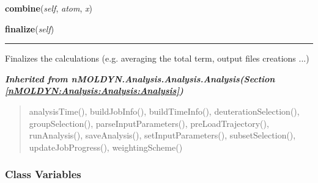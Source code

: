     \vspace{0.5ex}

\hspace{.8\funcindent}\begin{boxedminipage}{\funcwidth}

    \raggedright \textbf{combine}(\textit{self}, \textit{atom}, \textit{x})

\setlength{\parskip}{2ex}
\setlength{\parskip}{1ex}
    \end{boxedminipage}

    \label{nMOLDYN:Analysis:Dynamics:PassBandFilteredTrajectory:finalize}

    \vspace{0.5ex}

\hspace{.8\funcindent}\begin{boxedminipage}{\funcwidth}

    \raggedright \textbf{finalize}(\textit{self})

    \vspace{-1.5ex}

    \rule{\textwidth}{0.5\fboxrule}
\setlength{\parskip}{2ex}
    Finalizes the calculations (e.g. averaging the total term, output files
    creations ...)

\setlength{\parskip}{1ex}
    \end{boxedminipage}


\large{\textbf{\textit{Inherited from nMOLDYN.Analysis.Analysis.Analysis\textit{(Section \ref{nMOLDYN:Analysis:Analysis:Analysis})}}}}

\begin{quote}
analysisTime(), buildJobInfo(), buildTimeInfo(), deuterationSelection(), groupSelection(), parseInputParameters(), preLoadTrajectory(), runAnalysis(), saveAnalysis(), setInputParameters(), subsetSelection(), updateJobProgress(), weightingScheme()
\end{quote}


  \subsubsection{Class Variables}

